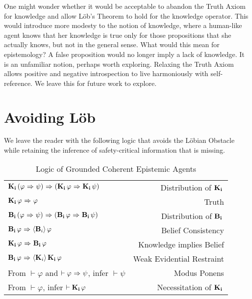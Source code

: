 One might wonder whether it would be acceptable to abandon the Truth Axiom for knowledge and allow L\"ob's Theorem to hold for the knowledge operator. This would introduce more modesty to the notion of knowledge, where a human-like agent knows that her knowledge is true only for those propositions that she actually knows, but not in the general sense. What would this mean for epistemology? A false proposition would no longer imply a lack of knowledge. It is an unfamiliar notion, perhaps worth exploring. Relaxing the Truth Axiom allows positive and negative introspection to live harmoniously with self-reference. We leave this for future work to explore.

\section{Avoiding L\"ob}
\label{sec:avoiding_lob}
We leave the reader with the following logic that avoids the L\"obian Obstacle while retaining the inference of safety-critical information that is missing.

\begin{table}[H]
	\begin{center}
		\begin{tabular}{| l r |}
			\hline
			$\mathbf{K}_{\mathbf{i}}\,(\varphi {\ \Rightarrow \ } \psi) {\ \Rightarrow \ } (\mathbf{K}_{\mathbf{i}}\,\varphi {\ \Rightarrow \ } \mathbf{K}_{\mathbf{i}}\,\psi)$ & Distribution of $\mathbf{K}_{\mathbf{i}}\,$ \\
			$\mathbf{K}_{\mathbf{i}}\,\varphi {\ \Rightarrow \ } \varphi$ & Truth \\
			$\mathbf{B}_{\mathbf{i}}\,(\varphi {\ \Rightarrow \ } \psi) {\ \Rightarrow \ } (\mathbf{B}_{\mathbf{i}}\,\varphi {\ \Rightarrow \ } \mathbf{B}_{\mathbf{i}}\,\psi)$ & Distribution of $\mathbf{B}_{\mathbf{i}}\,$\\
			$\mathbf{B}_{\mathbf{i}}\,\varphi {\ \Rightarrow \ } \langle \mathbf{B}_{i} \rangle\,\varphi$ & Belief Consistency \\
			$\mathbf{K}_{\mathbf{i}}\,\varphi {\ \Rightarrow \ } \mathbf{B}_{\mathbf{i}}\,\varphi$ & Knowledge implies Belief \\
			$\mathbf{B}_{\mathbf{i}}\,\varphi {\ \Rightarrow \ } \langle \mathbf{K}_{i} \rangle\,\mathbf{K}_{\mathbf{i}}\,\varphi$ & Weak Evidential Restraint\\
			From $\vdash \varphi$ and $\vdash \varphi {\ \Rightarrow \ } \psi$, infer $\vdash\psi$ & Modus Ponens\\
			From $\vdash \varphi$, infer $\vdash \mathbf{K}_{\mathbf{i}}\,\varphi$ & Necessitation of $\mathbf{K}_{\mathbf{i}}\,$\\
			\hline
		\end{tabular}
		\caption{Logic of Grounded Coherent Epistemic Agents}~\label{GC_agent}
	\end{center}
\end{table}

